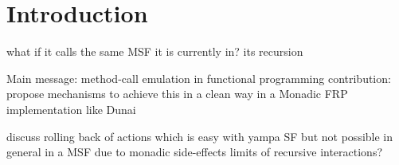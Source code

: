 \section{Introduction}

what if it calls the same MSF it is currently in? its recursion

Main message: method-call emulation in functional programming
contribution: propose mechanisms to achieve this in a clean way in a Monadic FRP implementation like Dunai

discuss rolling back of actions which is easy with yampa SF but not possible in general in a MSF due to monadic side-effects
limits of recursive interactions?